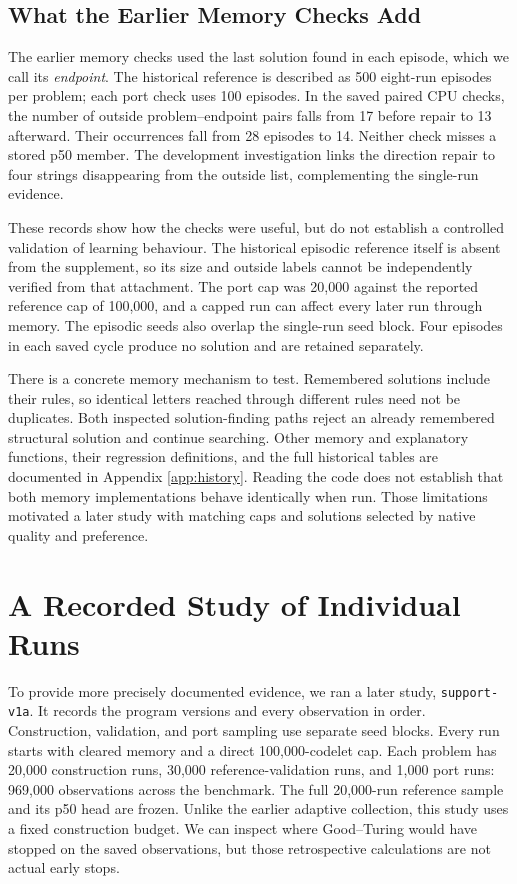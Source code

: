 \documentclass[10pt,letterpaper]{article}
\begin{document}
\subsection{What the Earlier Memory Checks Add}\label{sec:main-memory-history}

The earlier memory checks used the last solution found in each episode, which we call its
\emph{endpoint}. The historical reference is described as 500 eight-run episodes per
problem; each port check uses 100 episodes. In the saved paired CPU checks, the number of
outside problem--endpoint pairs falls from 17 before repair to 13 afterward. Their
occurrences fall from 28 episodes to 14. Neither check misses a stored p50 member. The
development investigation links the direction repair to four strings disappearing from the
outside list, complementing the single-run evidence.

These records show how the checks were useful, but do not establish a controlled
validation of learning behaviour. The historical episodic reference itself is absent from
the supplement, so its size and outside labels cannot be independently verified from that
attachment. The port cap was 20,000 against the reported reference cap of 100,000, and a
capped run can affect every later run through memory. The episodic seeds also overlap the
single-run seed block. Four episodes in each saved cycle produce no solution and are
retained separately.

There is a concrete memory mechanism to test. Remembered solutions include their rules, so
identical letters reached through different rules need not be duplicates. Both inspected
solution-finding paths reject an already remembered structural solution and continue
searching. Other memory and explanatory functions, their regression definitions, and the
full historical tables are documented in Appendix \ref{app:history}. Reading the code does
not establish that both memory implementations behave identically when run. Those
limitations motivated a later study with matching caps and solutions selected by native
quality and preference.

\section{A Recorded Study of Individual Runs}\label{sec:single-study}

To provide more precisely documented evidence, we ran a later study, \texttt{support-v1a}.
It records the program versions and every observation in order. Construction, validation,
and port sampling use separate seed blocks. Every run starts with cleared memory and a
direct 100,000-codelet cap. Each problem has 20,000 construction runs, 30,000
reference-validation runs, and 1,000 port runs: 969,000 observations across the benchmark.
The full 20,000-run reference sample and its p50 head are frozen. Unlike the earlier
adaptive collection, this study uses a fixed construction budget. We can inspect where
Good--Turing would have stopped on the saved observations, but those retrospective
calculations are not actual early stops.
\end{document}
